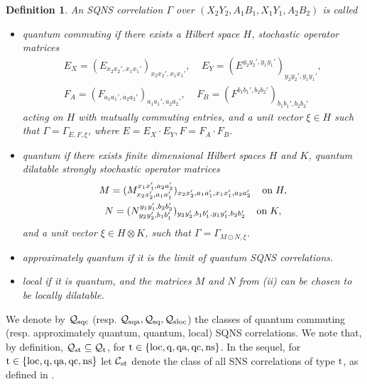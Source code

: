 \documentclass[11pt]{amsart}
\newtheorem{definition}[theorem]{Definition}
\newcommand{\cl}[1]{\mathcal{#1}}
\begin{document}
\begin{definition}\label{sqns_subclass_defn}
An SQNS correlation $\Gamma$ over $(X_{2}Y_{2}, A_{1}B_{1}, X_{1}Y_{1}, A_{2}B_{2})$ is called
\begin{itemize}
	\item[(i)] {\rm quantum commuting} if there exists a Hilbert space $H$, stochastic operator matrices
	\begin{gather*}\label{sqc_matrices}
		E_{X} = (E_{x_{2}x_{2}', x_{1}x_{1}'})_{x_{2}x_{2}', x_{1}x_{1}'}, \;\;\;\; E_{Y} = (E^{y_{2}y_{2}', y_{1}y_{1}'})_{y_{2}y_{2}', y_{1}y_{1}'},
\\	           F_{A} = (F_{a_{1}a_{1}', a_{2}a_{2}'})_{a_{1}a_{1}', a_{2}a_{2}'}, \;\;\;\; F_{B} = (F^{b_{1}b_{1}', b_{2}b_{2}'})_{b_{1}b_{1}', b_{2}b_{2}'}
	\end{gather*} 
	\noindent acting on $H$ with mutually commuting entries, and a unit vector $\xi \in H$ such that $\Gamma = \Gamma_{E, F, \xi}$, where $E = E_{X}\cdot E_{Y}, F = F_{A}\cdot F_{B}$.
	\item[(ii)] {\rm quantum} if there exists finite dimensional Hilbert spaces $H$ and $K$, quantum dilatable strongly stochastic operator matrices 
	\begin{gather*}\label{sq_matrices}
		M = (M_{x_{2}x_{2}', a_{1}a_{1}'}^{x_{1}x_{1}', a_{2}a_{2}'})_{x_{2}x_{2}', a_{1}a_{1}', x_{1}x_{1}', a_{2}a_{2}'} \;\;\;\; {\rm on \;} H, 
\\		N = (N_{y_{2}y_{2}', b_{1}b_{1}'}^{y_{1}y_{1}', b_{2}b_{2}'})_{y_{2}y_{2}', b_{1}b_{1}', y_{1}y_{1}', b_{2}b_{2}'} \;\;\;\; {\rm on \;} K,
	\end{gather*}
	\noindent and a unit vector $\xi \in H\otimes K$, such that $\Gamma = \Gamma_{M \odot N, \xi}$. 
	\item[(iii)] {\rm approximately quantum} if it is the limit of quantum SQNS correlations.
	\item[(iv)] {\rm local} if it is quantum, and the matrices $M$ and $N$ from (ii) can be chosen to be locally dilatable.
\end{itemize}
\end{definition}
We denote by $\cl{Q}_{\rm sqc}$ (resp. $\cl{Q}_{\rm sqa}, \cl{Q}_{\rm sq}, \cl{Q}_{\rm sloc}$) the classes of quantum commuting (resp. approximately quantum, quantum, local) SQNS correlations. We note that, by definition, $\cl{Q}_{\rm st} \subseteq \cl{Q}_{\rm t}$, for ${\rm t} \in \{\rm loc, q, qa, qc, ns\}$. In the sequel, for ${\rm t} \in \{\rm loc, q, qa, qc, ns\}$ let $\cl{C}_{\rm st}$ denote the class of all SNS correlations of type ${\rm t}$, as defined in \cite[Section 5]{gt_one}. 
\end{document}
